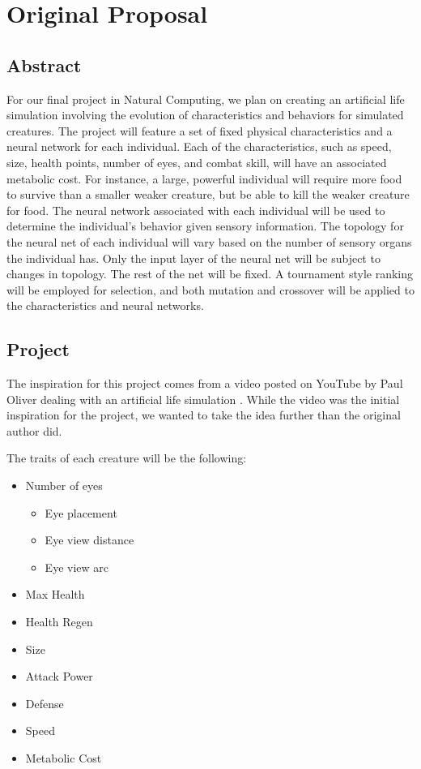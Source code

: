 
\chapter{Original Proposal}
\label{chap:originalProposal}
\section{Abstract}

For our final project in Natural Computing, we plan on creating an artificial life simulation involving the evolution of characteristics and behaviors for simulated creatures. The project will feature a set of fixed physical characteristics and a neural network for each individual. Each of the characteristics, such as speed, size, health points, number of eyes, and combat skill, will have an associated metabolic cost. For instance, a large, powerful individual will require more food to survive than a smaller weaker creature, but be able to kill the weaker creature for food. The neural network associated with each individual will be used to determine the individual's behavior given sensory information. The topology for the neural net of each individual will vary based on the number of sensory organs the individual has. Only the input layer of the neural net will be subject to changes in topology. The rest of the net will be fixed. A tournament style ranking will be employed for selection, and both mutation and crossover will be applied to the characteristics and neural networks.

\section{Project}

The inspiration for this project comes from a video posted on YouTube by Paul Oliver dealing with an artificial life simulation \cite{oliver}. While the video was the initial inspiration for the project, we wanted to take the idea further than the original author did.

The traits of each creature will be the following:

\begin{itemize}[noitemsep]
  \item Number of eyes
  \begin{itemize}[noitemsep]
     \item Eye placement
     \item Eye view distance
     \item Eye view arc
  \end{itemize}
  \item Max Health
  \item Health Regen
  \item Size
  \item Attack Power
  \item Defense
  \item Speed
  \item Metabolic Cost
\end{itemize}

